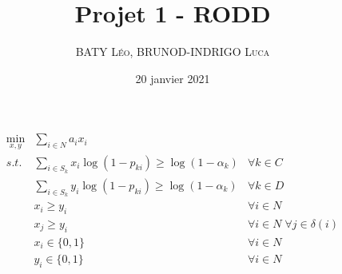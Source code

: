 \documentclass[12pt]{extarticle}
\title{Projet 1 -  RODD}
\date{20 janvier 2021}
\author{\textsc{BATY Léo}, \textsc{BRUNOD-INDRIGO Luca}}
\begin{document}
\maketitle

\begin{align*}
    \min_{x, y} &\sum_{i \in N} a_i x_i &\\
    s.t.   & \sum_{i \in S_k} x_i \log(1 - p_{ki}) \geq \log(1 - \alpha_k) & \forall k \in C\\
           & \sum_{i \in S_k} y_i \log(1 - p_{ki}) \geq \log(1 - \alpha_k) & \forall k \in D\\
           & x_i \geq y_i       & \forall i \in N\\
           & x_j \geq y_i       & \forall i \in N \; \forall j \in \delta(i)\\
           & x_i \in \{0, 1\}   & \forall i \in N\\
           & y_i \in \{0, 1\}   & \forall i \in N
\end{align*}
\end{document}
